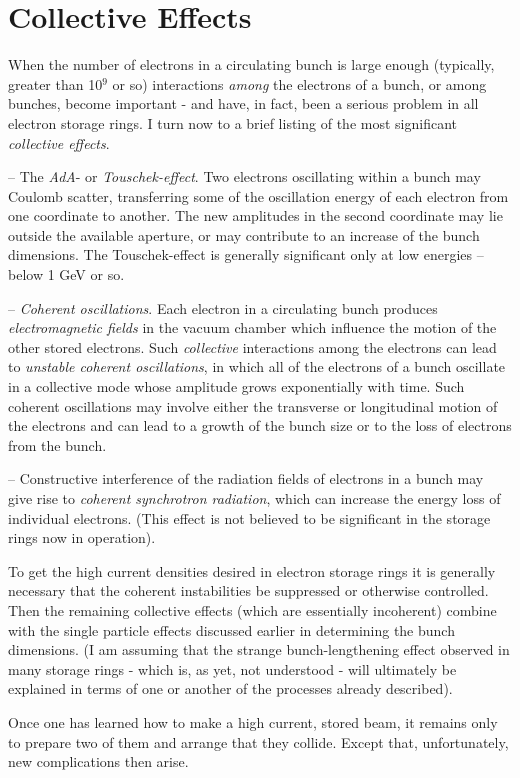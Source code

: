 \section{Collective Effects} \label{sec:1.3}
When the number of electrons in a circulating bunch is large enough (typically, greater than 10$^9$ or so) interactions \emph{among} the electrons of a bunch, or among bunches, become important - and have, in fact, been a serious problem in all electron storage rings. I turn now to a brief listing of the most significant \emph{collective effects}.

-- The \emph{AdA}- or \emph{Touschek-effect}. Two electrons oscillating within a bunch may Coulomb scatter, transferring some of the oscillation energy of each electron from one coordinate to another. The new amplitudes in the second coordinate may lie outside the available aperture, or may contribute to an increase of the bunch dimensions. The Touschek-effect is generally significant only at low energies -- below 1 GeV or so.

-- \emph{Coherent oscillations}. Each electron in a circulating bunch produces \emph{electromagnetic fields} in the vacuum chamber which influence the motion of the other stored electrons. Such \emph{collective} interactions among the electrons can lead to \emph{unstable coherent oscillations}, in which all of the electrons of a bunch oscillate in a collective mode whose amplitude grows exponentially with time. Such coherent oscillations may involve either the transverse or longitudinal motion of the electrons and can lead to a growth of the bunch size or to the loss of electrons from the bunch.

-- Constructive interference of the radiation fields of electrons in a bunch may give rise to \emph{coherent synchrotron radiation}, which can increase the energy loss of individual electrons. (This effect is not believed to be significant in the storage rings now in operation).

To get the high current densities desired in electron storage rings it is generally necessary that the coherent instabilities be suppressed or otherwise controlled. Then the remaining collective effects (which are essentially incoherent) combine with the single particle effects discussed earlier in determining the bunch dimensions. (I am assuming that the strange bunch-lengthening effect observed in many storage rings - which is, as yet, not understood - will ultimately be explained in terms of one or another of the processes already described).

Once one has learned how to make a high current, stored beam, it remains only to prepare two of them and arrange that they collide. Except that, unfortunately, new complications then arise.


